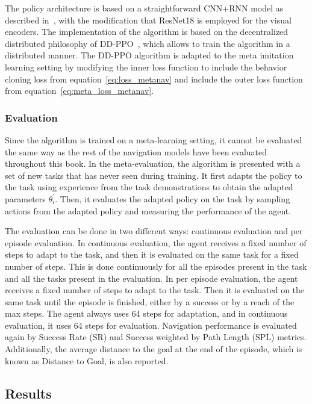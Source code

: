 The policy architecture is based on a straightforward CNN+RNN model as described in~\cite{ramrakhya2023}, with the modification that ResNet18 is employed for the visual encoders.
The implementation of the algorithm is based on the decentralized distributed philosophy of DD-PPO~\cite{wijmans2020}, which allows to train the algorithm in a distributed manner.
The DD-PPO algorithm is adapted to the meta imitation learning setting by modifying the inner loss function to include the behavior cloning loss from equation~\ref{eq:loss_metanav} and include the outer loss function from equation~\ref{eq:meta_loss_metanav}.

\subsubsection{Evaluation}\label{subsubsec:evaluation_metanav}

Since the algorithm is trained on a meta-learning setting, it cannot be evaluated the same way as the rest of the navigation models have been evaluated throughout this book.
In the meta-evaluation, the algorithm is presented with a set of new tasks that has never seen during training.
It first adapts the policy to the task using experience from the task demonstrations to obtain the adapted parameters $\theta^\prime_i$.
Then, it evaluates the adapted policy on the task by sampling actions from the adapted policy and measuring the performance of the agent.

The evaluation can be done in two different ways: continuous evaluation and per episode evaluation.
In continuous evaluation, the agent receives a fixed number of steps to adapt to the task, and then it is evaluated on the same task for a fixed number of steps.
This is done continuously for all the episodes present in the task and all the tasks present in the evaluation.
In per episode evaluation, the agent receives a fixed number of steps to adapt to the task.
Then it is evaluated on the same task until the episode is finished, either by a success or by a reach of the max steps.
The agent always uses 64 steps for adaptation, and in continuous evaluation, it uses 64 steps for evaluation.
Navigation performance is evaluated again by Success Rate (SR) and Success weighted by Path Length (SPL) metrics.
Additionally, the average distance to the goal at the end of the episode, which is known as Distance to Goal, is also reported.

\subsection{Results}\label{subsec:results_metanav}

